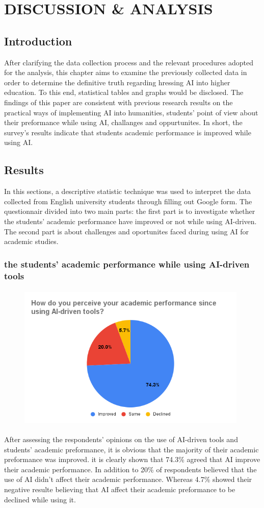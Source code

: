 \chapter{DISCUSSION \& ANALYSIS}
\section{Introduction}
After clarifying the data collection process and the relevant procedures adopted for
the analysis, this chapter aims to examine the previously collected data in order to determine
the definitive truth regarding hressing AI into higher education. To this end, statistical
tables and graphs would be disclosed. The findings of this
paper are consistent with previous research results on the practical ways of implementing AI into
humanities, students' point of view about their preformance while using AI, challanges and oppurtunites.
In short, the survey’s results indicate that students academic performance is improved while using AI.
\section{Results}
In this sections, a descriptive statistic technique was used to
interpret the data collected from English
university students through filling out Google form.
The questionnair divided into two main parts: the first part is to investigate
whether the students' academic performance have improved or not while using AI-driven. The second
part is about challenges and oportunites faced during using AI for academic studies.

\subsection{the students' academic performance while using AI-driven tools}
\begin{figure}[h]
	\centering
	\includegraphics[width=11cm, height=7cm]{./chap4/figures/prf}
\end{figure}
After assessing the respondents’ opinions on the use of AI-driven tools
and students' academic preformance, it is obvious that the majority
of their academic preformance was improved. it is clearly shown that
74.3\% agreed that AI improve their academic performance. In addition to
20\% of respondents believed that the use of AI didn't affect their academic
performance. Whereas 4.7\% showed their negative resulte believing that AI
affect their academic preformance to be declined while using it.

